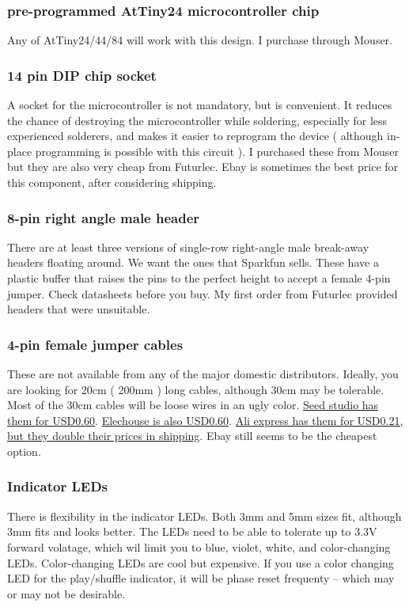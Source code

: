 \documentclass[11pt]{scrartcl}
\begin{document}
\subsubsection{pre-programmed AtTiny24 microcontroller chip}
Any of AtTiny24/44/84 will work with this design. I purchase through Mouser.
\subsubsection{14 pin DIP chip socket}
A socket for the microcontroller is not mandatory, but is convenient. It reduces the chance of destroying the microcontroller while soldering, especially for less experienced solderers, and makes it easier to reprogram the device ( although in-place programming is possible with this circuit ). I purchased these from Mouser but they are also very cheap from Futurlec. Ebay is sometimes the best price for this component, after considering shipping.
\subsubsection{8-pin right angle male header}
There are at least three versions of single-row right-angle male break-away headers floating around. We want the ones that Sparkfun sells. These have a plastic buffer that raises the pins to the perfect height to accept a female 4-pin jumper. Check datasheets before you buy. My first order from Futurlec provided headers that were unsuitable. 
\subsubsection{4-pin female jumper cables}
These are not available from any of the major domestic distributors. Ideally, you are looking for 20cm ( 200mm ) long cables, although 30cm may be tolerable. Most of the 30cm cables will be loose wires in an ugly color. \href{http://www.seeedstudio.com/depot/4-pin-dualfemale-jumper-wire-300mm-5-pcs-pack-p-97.html}{Seed studio has them for USD0.60}. \href{http://www.elechouse.com/elechouse/index.php?main_page=product_info&cPath=105_108&products_id=433}{Elechouse is also USD0.60}. \href{http://www.aliexpress.com/store/product/4-Pin-Dual-female-Jumper-Wire-wire-length-200mm-5pcs-bunch/505390_539192964.html}{Ali express has them for USD0.21, but they double their prices in shipping}. Ebay still seems to be the cheapest option. 
\subsubsection{Indicator LEDs} There is flexibility in the indicator LEDs. Both 3mm and 5mm sizes fit, although 3mm fits and looks better. The LEDs need to be able to tolerate up to 3.3V forward volatage, which wil limit you to blue, violet, white, and color-changing LEDs. Color-changing LEDs are cool but expensive. If you use a color changing LED for the play/shuffle indicator, it will be phase reset frequenty -- which may or may not be desirable. 
\end{document}
